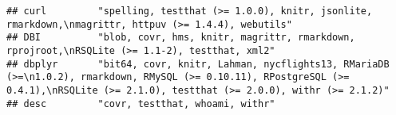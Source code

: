 \documentclass[]{book}
\begin{document}
\begin{verbatim}
## curl         "spelling, testthat (>= 1.0.0), knitr, jsonlite, rmarkdown,\nmagrittr, httpuv (>= 1.4.4), webutils"                                                                                                                                                                                                                                                                                                                                                                                                                                                                                                                                                                                                       
## DBI          "blob, covr, hms, knitr, magrittr, rmarkdown, rprojroot,\nRSQLite (>= 1.1-2), testthat, xml2"                                                                                                                                                                                                                                                                                                                                                                                                                                                                                                                                                                                                             
## dbplyr       "bit64, covr, knitr, Lahman, nycflights13, RMariaDB (>=\n1.0.2), rmarkdown, RMySQL (>= 0.10.11), RPostgreSQL (>= 0.4.1),\nRSQLite (>= 2.1.0), testthat (>= 2.0.0), withr (>= 2.1.2)"                                                                                                                                                                                                                                                                                                                                                                                                                                                                                                                      
## desc         "covr, testthat, whoami, withr"                                                                                                                                                                                                                                                                                                                                                                                                                                                                                                                                                                                                                                                                           

\end{verbatim}
\end{document}
